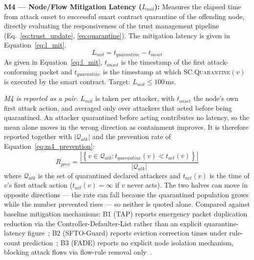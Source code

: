 \documentclass[12pt, a4paper]{report}
\begin{document}
{{%

\textbf{M4 — Node/Flow Mitigation Latency
($L_{mit}$):}
Measures the elapsed time from attack onset to
successful smart contract quarantine of the offending
node, directly evaluating the responsiveness of the
trust management pipeline
(Eq.~\ref{eq:trust_update}, \ref{eq:quarantine}).
The mitigation latency is given in
Equation~\eqref{eq:l_mit}.
\begin{equation}
L_{mit} = t_{quarantine} - t_{onset}
\label{eq:l_mit}
\end{equation}
As given in Equation~\eqref{eq:l_mit},
$t_{onset}$ is the timestamp of the first
attack-conforming packet and $t_{quarantine}$ is the
timestamp at which \textsc{SC.Quarantine}$(v)$ is
executed by the smart contract. Target: $L_{mit}
\leq 100$\,ms.

\textit{M4 is reported as a pair.} $L_{mit}$ is taken per attacker,
with $t_{onset}$ the node's own first attack action, and averaged only
over attackers that acted before being quarantined. An attacker
quarantined before acting contributes no latency, so the mean alone
moves in the wrong direction as containment improves. It is therefore
reported together with $|\mathcal{Q}_{atk}|$ and the prevention rate
of Equation~\eqref{eq:m4_prevention}:
\begin{equation}
R_{prev} =
\frac{\left|\left\{v \in \mathcal{Q}_{atk} : t_{quarantine}(v) < t_{act}(v)\right\}\right|}
{\left|\mathcal{Q}_{atk}\right|}
\label{eq:m4_prevention}
\end{equation}
where $\mathcal{Q}_{atk}$ is the set of quarantined declared attackers
and $t_{act}(v)$ is the time of $v$'s first attack action
($t_{act}(v)=\infty$ if $v$ never acts). The two halves can move in
opposite directions --- the rate can fall because the quarantined
population grows while the number prevented rises --- so neither is
quoted alone. Compared against baseline mitigation mechanisms:
B1 (TAP) reports emergency packet duplication
reduction via the Controller-Defaulter-List rather
than an explicit quarantine-latency
figure~\cite{Arsalan2018}; B2 (SFTO-Guard) reports
eviction correction times under rule-count
prediction~\cite{Tang2023SFTO}; B3 (FADE) reports no
explicit node isolation mechanism, blocking attack
flows via flow-rule removal
only~\cite{Zhang2021FADE}.


}}
\end{document}

